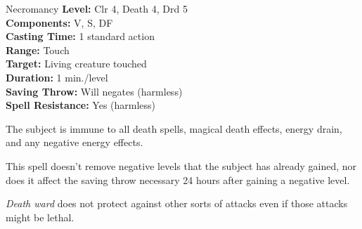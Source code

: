 {Necromancy}
{
	\textbf{Level:}
	Clr 4, Death 4, Drd 5\\
	\textbf{Components:}
	V, S, DF\\
	\textbf{Casting Time:}
	1 standard action\\
	\textbf{Range:}
	Touch\\
	\textbf{Target:}
	Living creature touched\\
	\textbf{Duration:}
	1 min./level\\
	\textbf{Saving Throw:}
	Will negates (harmless)\\
	\textbf{Spell Resistance:}
	Yes (harmless)\\
}
{
	The subject is immune to all death spells, magical death effects, energy drain, and any negative energy effects.

	This spell doesn't remove negative levels that the subject has already gained, nor does it affect the saving throw necessary 24 hours after gaining a negative level.

	\emph{Death ward} does not protect against other sorts of attacks even if those attacks might be lethal.

}
